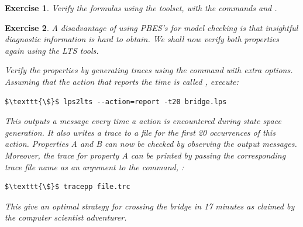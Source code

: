 \documentclass[11pt]{article}
\theoremstyle{myplain}
\newtheorem{exercise}{Exercise}
\theoremstyle{definition} %
\begin{document}
\begin{exercise}
Verify the formulas using the toolset, with the commands  and .
\end{exercise}

\begin{exercise}
A disadvantage of using PBES's for model checking is that insightful diagnostic information is hard to obtain. We shall now verify both properties again using the LTS tools.

Verify the properties by generating traces using the  command with extra options. Assuming that the action that reports the time is called , execute:

\begin{lstlisting}[style=bash]
$\texttt{\$}$ lps2lts --action=report -t20 bridge.lps
\end{lstlisting}

This outputs a message every time a  action is encountered during state space generation. It also writes a trace to a file for the first 20 occurrences of this action. Properties A and B can now be checked by observing the output messages. Moreover, the trace for property A can be printed by passing the corresponding trace file name as an argument to the  command, \eg:
%
\begin{lstlisting}[style=bash]
$\texttt{\$}$ tracepp file.trc
\end{lstlisting}
%
This give an optimal strategy for crossing the bridge in 17 minutes as claimed by the computer scientist adventurer.

\end{exercise}
\end{document}
